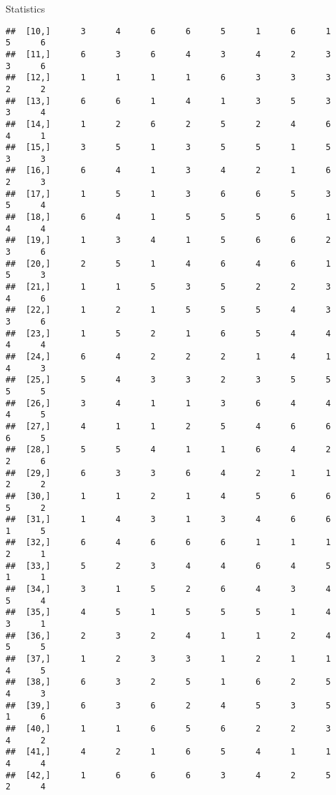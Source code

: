 \documentclass[
  ignorenonframetext,
]{beamer}
\begin{document}
\begin{frame}[fragile]{Statistics}
\begin{verbatim}
##  [10,]      3      4      6      6      5      1      6      1      5      6
##  [11,]      6      3      6      4      3      4      2      3      3      6
##  [12,]      1      1      1      1      6      3      3      3      2      2
##  [13,]      6      6      1      4      1      3      5      3      3      4
##  [14,]      1      2      6      2      5      2      4      6      4      1
##  [15,]      3      5      1      3      5      5      1      5      3      3
##  [16,]      6      4      1      3      4      2      1      6      2      3
##  [17,]      1      5      1      3      6      6      5      3      5      4
##  [18,]      6      4      1      5      5      5      6      1      4      4
##  [19,]      1      3      4      1      5      6      6      2      3      6
##  [20,]      2      5      1      4      6      4      6      1      5      3
##  [21,]      1      1      5      3      5      2      2      3      4      6
##  [22,]      1      2      1      5      5      5      4      3      3      6
##  [23,]      1      5      2      1      6      5      4      4      4      4
##  [24,]      6      4      2      2      2      1      4      1      4      3
##  [25,]      5      4      3      3      2      3      5      5      5      5
##  [26,]      3      4      1      1      3      6      4      4      4      5
##  [27,]      4      1      1      2      5      4      6      6      6      5
##  [28,]      5      5      4      1      1      6      4      2      2      6
##  [29,]      6      3      3      6      4      2      1      1      2      2
##  [30,]      1      1      2      1      4      5      6      6      5      2
##  [31,]      1      4      3      1      3      4      6      6      1      5
##  [32,]      6      4      6      6      6      1      1      1      2      1
##  [33,]      5      2      3      4      4      6      4      5      1      1
##  [34,]      3      1      5      2      6      4      3      4      5      4
##  [35,]      4      5      1      5      5      5      1      4      3      1
##  [36,]      2      3      2      4      1      1      2      4      5      5
##  [37,]      1      2      3      3      1      2      1      1      4      5
##  [38,]      6      3      2      5      1      6      2      5      4      3
##  [39,]      6      3      6      2      4      5      3      5      1      6
##  [40,]      1      1      6      5      6      2      2      3      4      2
##  [41,]      4      2      1      6      5      4      1      1      4      4
##  [42,]      1      6      6      6      3      4      2      5      2      4

\end{verbatim}
\end{frame}
\end{document}
